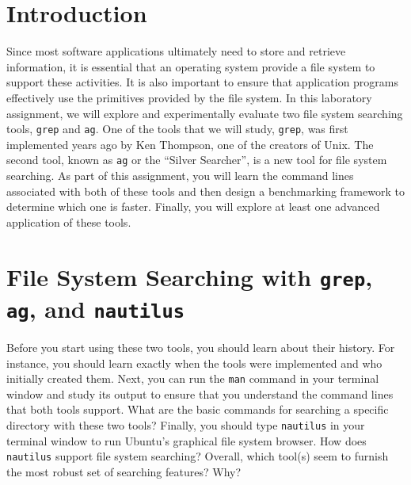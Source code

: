 


\usepackage[compact]{titlesec}



\section*{Introduction}

Since most software applications ultimately need to store and retrieve information, it is essential that an operating
system  provide a file system to support these activities.  It is also important to ensure that application programs
effectively use the primitives provided by the file system.  In this laboratory assignment, we will explore and
experimentally evaluate two file system searching tools, {\tt grep} and {\tt ag}. One of the tools that we will study,
{\tt grep}, was first implemented years ago by Ken Thompson, one of the creators of Unix.  The second tool, known as
{\tt ag} or the ``Silver Searcher'', is a new tool for file system searching. As part of this assignment, you will learn
the command lines associated with both of these tools and then design a benchmarking framework to determine which one is
faster.  Finally, you will explore at least one advanced application of these tools.

\section*{File System Searching with {\tt grep}, {\tt ag}, and {\tt nautilus}}

Before you start using these two tools, you should learn about their history. For instance, you should learn exactly
when the tools were implemented and who initially created them. Next, you can run the {\tt man} command in your terminal
window and study its output to ensure that you understand the command lines that both tools support. What are the basic
commands for searching a specific directory with these two tools? Finally, you should type {\tt nautilus} in your
terminal window to run Ubuntu's graphical file system browser.  How does {\tt nautilus} support file system searching?
Overall, which tool(s) seem to furnish the most robust set of searching features? Why?

